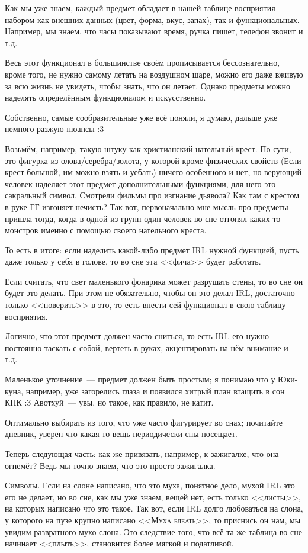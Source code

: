 \documentclass[a4paper,14pt,oneside]{memoir}
\begin{document}
Как мы уже знаем, каждый предмет обладает в нашей таблице восприятия набором как внешних данных (цвет, форма, вкус, запах), так и функциональных. Например, мы знаем, что часы показывают время, ручка пишет, телефон звонит и т.д.
 
Весь этот функционал в большинстве своём прописывается бессознательно, кроме того, не нужно самому летать на воздушном шаре, можно его даже вживую за всю жизнь не увидеть, чтобы знать, что он летает. Однако предметы можно наделять определённым функционалом и искусственно. 

Собственно, самые сообразительные уже всё поняли, я думаю, дальше уже немного разжую нюансы :3 

Возьмём, например, такую штуку как христианский нательный крест. По сути, это фигурка из олова/серебра/золота, у которой кроме физических свойств (Если крест большой, им можно взять и уебать) ничего особенного и нет, но верующий человек наделяет этот предмет дополнительными функциями, для него это сакральный символ. Смотрели фильмы про изгнание дьявола? Как там с крестом в руке ГГ изгоняет нечисть? Так вот, первоначально мне мысль про предметы пришла тогда, когда в одной из групп один человек во сне отгонял каких-то монстров именно с помощью своего нательного креста. 

То есть в итоге: если наделить какой-либо предмет IRL нужной функцией, пусть даже только у себя в голове, то во сне эта <<фича>> будет работать.
 
Если считать, что свет маленького фонарика может разрушать стены, то во сне он будет это делать. При этом не обязательно, чтобы он это делал IRL, достаточно только <<поверить>> в это, то есть внести сей функционал в свою таблицу восприятия. 

Логично, что этот предмет должен часто сниться, то есть IRL его нужно постоянно таскать с собой, вертеть в руках, акцентировать на нём внимание и т.д.

Маленькое уточнение~--- предмет должен быть простым; я понимаю что у Юки-куна, например, уже загорелись глаза и появился хитрый план втащить в сон КПК :3 Авотхуй~--- увы, но такое, как правило, не катит.

Оптимально выбирать из того, что уже часто фигурирует во снах; почитайте дневник, уверен что какая-то вещь периодически сны посещает.

Теперь следующая часть: как же привязать, например, к зажигалке, что она огнемёт? Ведь мы точно знаем, что это просто зажигалка.

Символы. Если на слоне написано, что это муха, понятное дело, мухой IRL это его не делает, но во сне, как мы уже знаем, вещей нет, есть только <<листы>>, на которых написано что это такое. Так вот, если IRL долго любоваться на слона, у которого на пузе крупно написано <<\textsc{Муха блеать}>>, то приснись он нам, мы увидим развратного мухо-слона. Это следствие того, что всё та же таблица во сне начинает <<плыть>>, становится более мягкой и податливой. 
\end{document}
